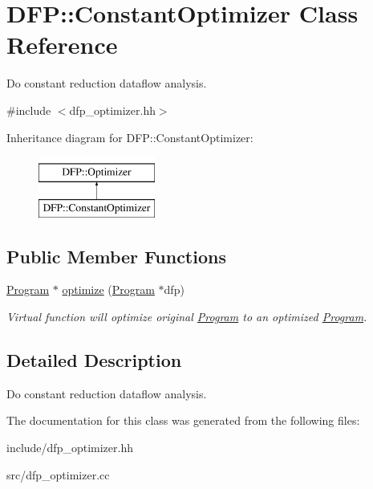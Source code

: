 \hypertarget{class_d_f_p_1_1_constant_optimizer}{}\section{D\+FP\+:\+:Constant\+Optimizer Class Reference}
\label{class_d_f_p_1_1_constant_optimizer}


Do constant reduction dataflow analysis.  




{\ttfamily \#include $<$dfp\+\_\+optimizer.\+hh$>$}

Inheritance diagram for D\+FP\+:\+:Constant\+Optimizer\+:\begin{figure}[H]
\begin{center}
\leavevmode
\includegraphics[height=2.000000cm]{class_d_f_p_1_1_constant_optimizer}
\end{center}
\end{figure}
\subsection*{Public Member Functions}
\begin{DoxyCompactItemize}
\item 
\hyperlink{class_d_f_p_1_1_program}{Program} $\ast$ \hyperlink{class_d_f_p_1_1_constant_optimizer_acb6df761c4de78ad622818d400b6f6bd}{optimize} (\hyperlink{class_d_f_p_1_1_program}{Program} $\ast$dfp)\hypertarget{class_d_f_p_1_1_constant_optimizer_acb6df761c4de78ad622818d400b6f6bd}{}\label{class_d_f_p_1_1_constant_optimizer_acb6df761c4de78ad622818d400b6f6bd}

\begin{DoxyCompactList}\small\item\em Virtual function will optimize original \hyperlink{class_d_f_p_1_1_program}{Program} to an optimized \hyperlink{class_d_f_p_1_1_program}{Program}. \end{DoxyCompactList}\end{DoxyCompactItemize}


\subsection{Detailed Description}
Do constant reduction dataflow analysis. 

The documentation for this class was generated from the following files\+:\begin{DoxyCompactItemize}
\item 
include/dfp\+\_\+optimizer.\+hh\item 
src/dfp\+\_\+optimizer.\+cc\end{DoxyCompactItemize}
